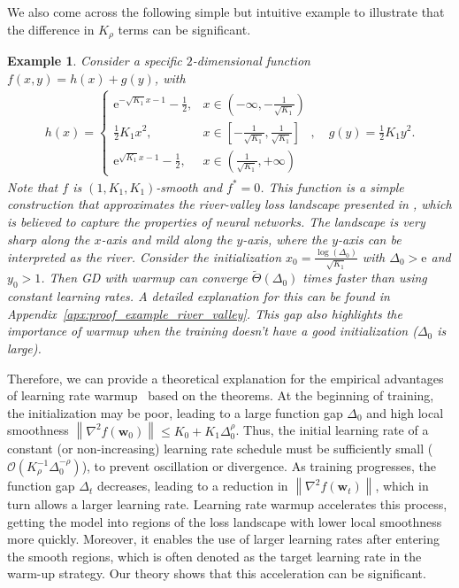 \documentclass{article}
\newtheorem{example}{Example}
\newcommand{\Norm}[1]{\left\|#1\right\|}
\newcommand{\Kr}{K_{\rho}}
\newcommand{\bw}{\mathbf{w}}
\begin{document}
We also come across the following simple but intuitive example to illustrate that the difference in $K_\rho$ terms can be significant. 


\begin{example}\label{example:river_valley}
    Consider a specific $2$-dimensional function $f(x,y) = h(x) + g(y)$, with
    \begin{align*}
        h(x) = \left\{ \begin{array}{cc}
            \mathrm{e}^{-\sqrt{K_1}x - 1} - \frac{1}{2}, & x \in (-\infty, -\frac{1}{\sqrt{K_1}}) \\
            \frac{1}{2} K_1 x^2 , & x\in [-\frac{1}{\sqrt{K_1}}, \frac{1}{\sqrt{K_1}}] \\
            \mathrm{e}^{\sqrt{K_1}x - 1} - \frac{1}{2}, & x \in (\frac{1}{\sqrt{K_1}}, +\infty)
        \end{array} \right.
        ,\quad
        g(y) = \frac{1}{2} K_1 y^2.
    \end{align*}
    {Note that $f$ is $(1,K_1, K_1)$-smooth and $f^* = 0$}.
    This function is a simple construction that approximates the river-valley loss landscape presented in \cite{wen2024understanding}, which is believed to capture the properties of neural networks. The landscape is very sharp along the $x$-axis and mild along the $y$-axis, where the $y$-axis can be interpreted as the river. 
    Consider the initialization $x_0 = \frac{\log(\Delta_0)}{\sqrt{K_1}}$ with $\Delta_0 > \mathrm{e}$ and $y_0 > 1$. 
    Then GD with warmup can converge $\tilde{\Theta}(\Delta_0)$ times faster than using constant learning rates. 
    A detailed explanation for this can be found in Appendix~\ref{apx:proof_example_river_valley}. 
    This gap also highlights the importance of warmup when the training doesn't have a good initialization ($\Delta_0$ is large).
\end{example}


Therefore, we can provide a theoretical explanation for the empirical advantages of learning rate warmup~\citep{kalra2024warmup, gilmer2022loss} based on the theorems. 
At the beginning of training, 
the initialization may be poor, leading to a large function gap $\Delta_0$ and high local smoothness $\Norm{\nabla^2 f(\bw_0)}\leq K_0+K_1\Delta_0^\rho$. Thus, the initial learning rate of a constant (or non-increasing) learning rate schedule must be sufficiently small ($\mathcal{O}(\Kr^{-1}\Delta_0^{-\rho})$), to prevent oscillation or divergence. As training progresses, the function gap $\Delta_t$ decreases, leading to a reduction in $\Norm{\nabla^2 f(\bw_t)}$, which in turn allows a larger learning rate. Learning rate warmup accelerates this process, getting the model into regions of the loss landscape with lower local smoothness more quickly. Moreover, it enables the use of larger learning rates after entering the smooth regions, which is often denoted as the target learning rate in the warm-up strategy.
Our theory shows that this acceleration can be significant.
\end{document}
